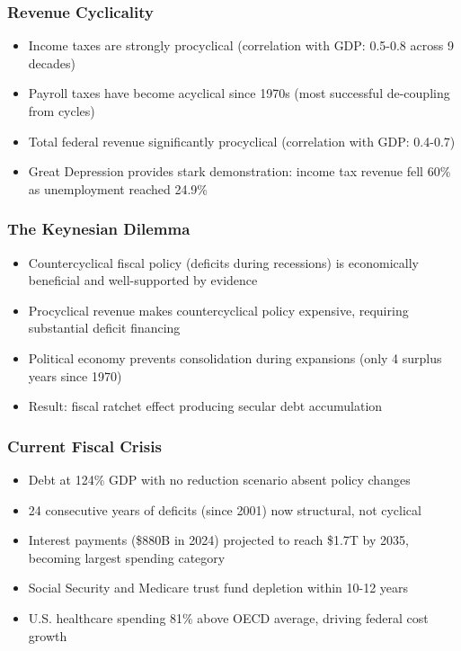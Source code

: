 \documentclass[12pt,letterpaper]{article}
\begin{document}
\subsubsection{Revenue Cyclicality}

\begin{itemize}
    \item Income taxes are strongly procyclical (correlation with GDP: 0.5-0.8 across 9 decades)
    \item Payroll taxes have become acyclical since 1970s (most successful de-coupling from cycles)
    \item Total federal revenue significantly procyclical (correlation with GDP: 0.4-0.7)
    \item Great Depression provides stark demonstration: income tax revenue fell 60\% as unemployment reached 24.9\%
\end{itemize}

\subsubsection{The Keynesian Dilemma}

\begin{itemize}
    \item Countercyclical fiscal policy (deficits during recessions) is economically beneficial and well-supported by evidence
    \item Procyclical revenue makes countercyclical policy expensive, requiring substantial deficit financing
    \item Political economy prevents consolidation during expansions (only 4 surplus years since 1970)
    \item Result: fiscal ratchet effect producing secular debt accumulation
\end{itemize}

\subsubsection{Current Fiscal Crisis}

\begin{itemize}
    \item Debt at 124\% GDP with no reduction scenario absent policy changes
    \item 24 consecutive years of deficits (since 2001) now structural, not cyclical
    \item Interest payments (\$880B in 2024) projected to reach \$1.7T by 2035, becoming largest spending category
    \item Social Security and Medicare trust fund depletion within 10-12 years
    \item U.S. healthcare spending 81\% above OECD average, driving federal cost growth
\end{itemize}
\end{document}
